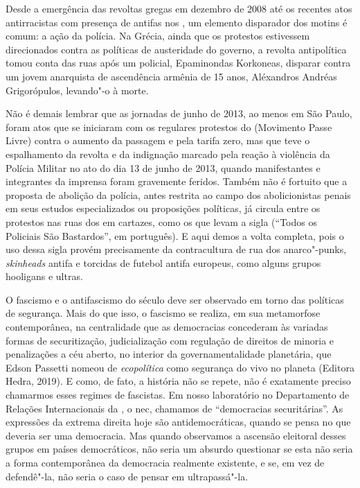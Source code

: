 Desde a emergência das revoltas gregas em dezembro de 2008 até os
recentes atos antirracistas com presença de antifas nos , um elemento
disparador dos motins é comum: a ação da polícia. Na Grécia, ainda que
os protestos estivessem direcionados contra as políticas de austeridade
do governo, a revolta antipolítica tomou conta das ruas após um
policial, Epaminondas Korkoneas, disparar contra um jovem anarquista de
ascendência armênia de 15 anos, Aléxandros Andréas Grigorópulos,
levando"-o à morte.

Não é demais lembrar que as jornadas de junho de 2013, ao menos em São
Paulo, foram atos que se iniciaram com os regulares protestos do 
(Movimento Passe Livre) contra o aumento da passagem e pela tarifa zero,
mas que teve o espalhamento da revolta e da indignação marcado pela
reação à violência da Polícia Militar no ato do dia 13 de junho de 2013,
quando manifestantes e integrantes da imprensa foram gravemente feridos.
Também não é fortuito que a proposta de abolição da polícia, antes
restrita ao campo dos abolicionistas penais em seus estudos
especializados ou proposições políticas, já circula entre os protestos
nas ruas dos  em cartazes, como os que levam a sigla 
(``Todos os Policiais São Bastardos'', em português). E aqui demos a
volta completa, pois o uso dessa sigla provém precisamente da
contracultura de rua dos anarco"-punks, \emph{skinheads} antifa e torcidas de
futebol antifa europeus, como alguns grupos hooligans e ultras.

O fascismo e o antifascismo do século  deve ser observado em torno
das políticas de segurança. Mais do que isso, o fascismo se realiza, em
sua metamorfose contemporânea, na centralidade que as democracias
concederam às variadas formas de securitização, judicialização com
regulação de direitos de minoria e penalizações a céu aberto, no
interior da governamentalidade planetária, que Edson Passetti nomeou de
\emph{ecopolítica} como segurança do vivo no planeta (Editora Hedra,
2019). E como, de fato, a história não se repete, não é exatamente preciso
chamarmos esses regimes de fascistas. Em nosso laboratório no
Departamento de Relações Internacionais da , o nec, chamamos
de ``democracias securitárias''. As expressões da extrema direita hoje
são antidemocráticas, quando se pensa no que deveria ser uma democracia.
Mas quando observamos a ascensão eleitoral desses grupos em países
democráticos, não seria um absurdo questionar se esta não seria a forma
contemporânea da democracia realmente existente, e se, em vez de
defendê"-la, não seria o caso de pensar em ultrapassá"-la.

